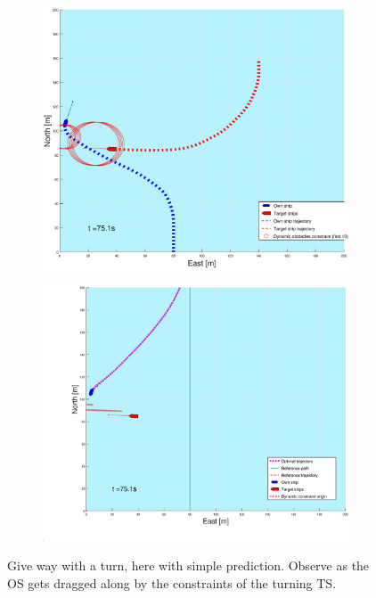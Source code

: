 \begin{figure}[ht!]
\begin{subfigure}[b]{0.499\textwidth}
    \end{subfigure}
    \hfill
    \\
    \begin{subfigure}[b]{0.49\textwidth}
        \centering
        \includegraphics[width=\textwidth]{Images/Figures/sving_GW/_Simple_1fig1_time=75}
    \end{subfigure}
    \hfill
    \begin{subfigure}[b]{0.499\textwidth}
        \centering
        \includegraphics[width=\textwidth]{Images/Figures/sving_GW/_Simple_1fig999_time=75}
    \end{subfigure}
    \hfill
    \caption{Give way with a turn, here with simple prediction. Observe as the OS gets dragged along by the constraints of the turning TS.}
    \label{FIG: turn GW simple pred}
\end{figure}%
